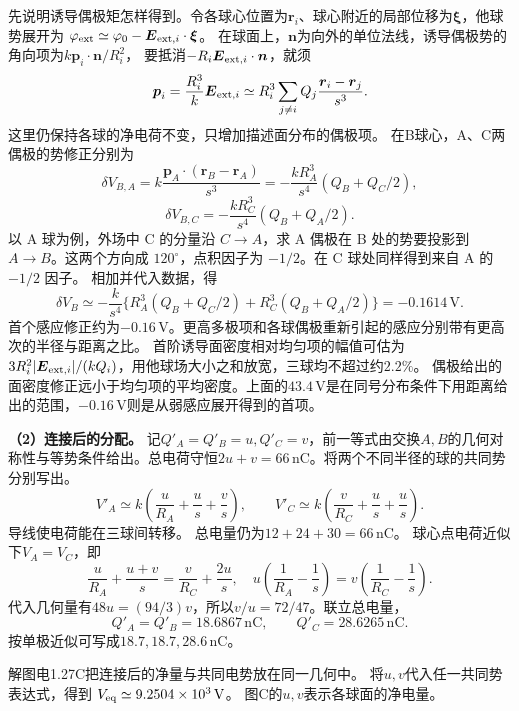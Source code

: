 \documentclass[UTF8,fontset=fandol,a4paper,11pt]{ctexart}
\newcommand{\result}[1]{\begin{equation*}\boxed{#1}\end{equation*}}
\begin{document}
先说明诱导偶极矩怎样得到。令各球心位置为$\boldsymbol r_i$、球心附近的局部位移为$\boldsymbol\xi$，他球势展开为
$\varphi_{\rm ext}\simeq\varphi_0-\boldsymbol E_{{\rm ext},i}\cdot\boldsymbol\xi$。
在球面上，$\boldsymbol n$为向外的单位法线，诱导偶极势的角向项为$k\boldsymbol p_i\cdot\boldsymbol n/R_i^2$，
要抵消$-R_i\boldsymbol E_{{\rm ext},i}\cdot\boldsymbol n$，就须
\[
\boldsymbol p_i=\frac{R_i^3}{k}\boldsymbol E_{{\rm ext},i}
\simeq R_i^3\sum_{j\ne i}Q_j\frac{\boldsymbol r_i-\boldsymbol r_j}{s^3}.
\]
这里仍保持各球的净电荷不变，只增加描述面分布的偶极项。
在B球心，A、C两偶极的势修正分别为
\[
\delta V_{B,A}=k\frac{\boldsymbol p_A\cdot(\boldsymbol r_B-\boldsymbol r_A)}{s^3}
=-\frac{kR_A^3}{s^4}(Q_B+Q_C/2),
\]
\[
\delta V_{B,C}=-\frac{kR_C^3}{s^4}(Q_B+Q_A/2).
\]
以 A 球为例，外场中 C 的分量沿 $C\to A$，求 A 偶极在 B 处的势要投影到 $A\to B$。这两个方向成 $120^\circ$，点积因子为 $-1/2$。在 C 球处同样得到来自 A 的 $-1/2$ 因子。
相加并代入数据，得
\[
\delta V_B\simeq-\frac{k}{s^4}
\{R_A^3(Q_B+Q_C/2)+R_C^3(Q_B+Q_A/2)\}
=-0.1614\,\mathrm V.
\]
首个感应修正约为$-0.16\,\mathrm V$。更高多极项和各球偶极重新引起的感应分别带有更高次的半径与距离之比。
首阶诱导面密度相对均匀项的幅值可估为
$3R_i^2|\boldsymbol E_{{\rm ext},i}|/(kQ_i)$，用他球场大小之和放宽，三球均不超过约$2.2\%$。
偶极给出的面密度修正远小于均匀项的平均密度。上面的$43.4\,\mathrm V$是在同号分布条件下用距离给出的范围，$-0.16\,\mathrm V$则是从弱感应展开得到的首项。

\textbf{（2）连接后的分配。} 记$Q'_A=Q'_B=u,Q'_C=v$，前一等式由交换$A,B$的几何对称性与等势条件给出。总电荷守恒$2u+v=66\,\mathrm{nC}$。将两个不同半径的球的共同势分别写出。
\[
V'_A\simeq k\left(\frac u{R_A}+\frac u{s}+\frac v{s}\right),\qquad
V'_C\simeq k\left(\frac v{R_C}+\frac u{s}+\frac u{s}\right).
\]
导线使电荷能在三球间转移。
总电量仍为$12+24+30=66\,\mathrm{nC}$。
球心点电荷近似下$V_A=V_C$，即
\[\frac u{R_A}+\frac{u+v}{s}=\frac v{R_C}+\frac{2u}{s},\quad
u\left(\frac1{R_A}-\frac1s\right)=v\left(\frac1{R_C}-\frac1s\right).
\]
代入几何量有$48u=(94/3)v$，所以$v/u=72/47$。联立总电量，
\result{Q'_A=Q'_B=18.6867\,\mathrm{nC},\qquad Q'_C=28.6265\,\mathrm{nC}.}
按单极近似可写成$18.7,18.7,28.6\,\mathrm{nC}$。

解图电1.27C把连接后的净量与共同电势放在同一几何中。
将$u,v$代入任一共同势表达式，得到
$V_{\rm eq}\simeq9.2504\times10^3\,\mathrm V$。
图C的$u,v$表示各球面的净电量。
\end{document}

